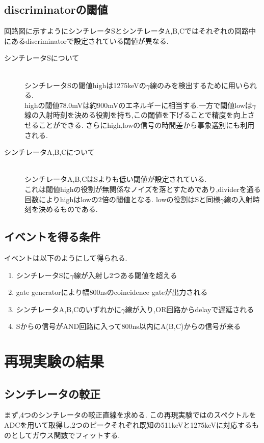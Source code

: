 \subsection{discriminatorの閾値}
回路図に示すようにシンチレータSとシンチレータA,B,Cではそれぞれの回路中にあるdiscriminatorで設定されている閾値が異なる.
\begin{description}
	\item[シンチレータSについて]\mbox{}\\
		シンチレータSの閾値highは1275keVの$\gamma$線のみを検出するために用いられる.\\
		highの閾値78.0mVは約900mVのエネルギーに相当する.一方で閾値lowは$\gamma$線の入射時刻を決める役割を持ち,この閾値を下げることで精度を向上させることができる.
		さらにhigh,lowの信号の時間差から事象選別にも利用される.
	\item[シンチレータA,B,Cについて]\mbox{}\\
		シンチレータA,B,CはSよりも低い閾値が設定されている.\\
		これは閾値highの役割が無関係なノイズを落とすためであり,dividerを通る回数によりhighはlowの2倍の閾値となる.
		lowの役割はSと同様$\gamma$線の入射時刻を決めるものである.
\end{description}

\subsection{イベントを得る条件}
イベントは以下のようにして得られる.
\begin{enumerate}
	\item シンチレータSに$\gamma$線が入射し2つある閾値を超える
	\item gate generatorにより幅800nsのcoincidence gateが出力される
	\item シンチレータA,B,Cのいずれかに$\gamma$線が入り,OR回路からdelayで遅延される
	\item Sからの信号がAND回路に入って800ns以内にA(B,C)からの信号が来る
\end{enumerate}

\section{再現実験の結果}

\subsection{シンチレータの較正}
まず,4つのシンチレータの較正直線を求める.
この再現実験ではのスペクトルをADCを用いて取得し,2つのピークそれぞれ既知の511keVと1275keVに対応するものとしてガウス関数でフィットする.

